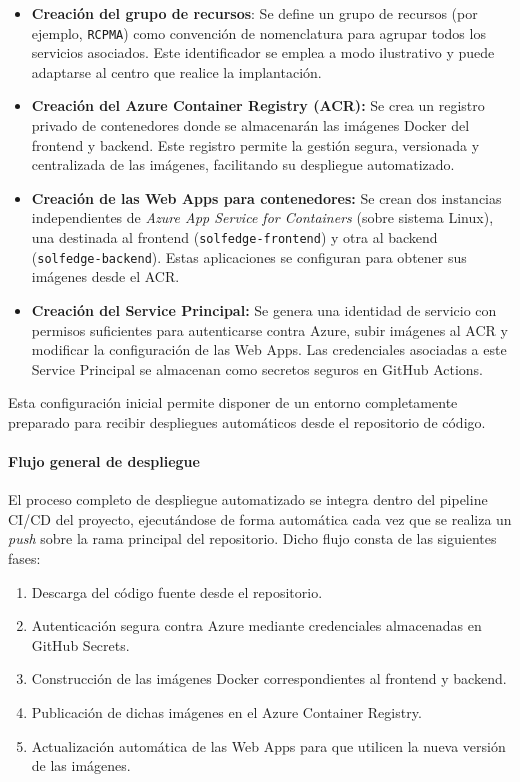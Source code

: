 \begin{itemize}
    \item \textbf{Creación del grupo de recursos}: Se define un grupo de recursos (por ejemplo, \texttt{RCPMA}) como convención de nomenclatura para agrupar todos los servicios asociados. Este identificador se emplea a modo ilustrativo y puede adaptarse al centro que realice la implantación.
    
    \item \textbf{Creación del Azure Container Registry (ACR):} Se crea un registro privado de contenedores donde se almacenarán las imágenes Docker del frontend y backend. Este registro permite la gestión segura, versionada y centralizada de las imágenes, facilitando su despliegue automatizado.
    
    \item \textbf{Creación de las Web Apps para contenedores:} Se crean dos instancias independientes de \textit{Azure App Service for Containers} (sobre sistema Linux), una destinada al frontend (\texttt{solfedge-frontend}) y otra al backend (\texttt{solfedge-backend}). Estas aplicaciones se configuran para obtener sus imágenes desde el ACR.
    
    \item \textbf{Creación del Service Principal:} Se genera una identidad de servicio con permisos suficientes para autenticarse contra Azure, subir imágenes al ACR y modificar la configuración de las Web Apps. Las credenciales asociadas a este Service Principal se almacenan como secretos seguros en GitHub Actions.
\end{itemize}

Esta configuración inicial permite disponer de un entorno completamente preparado para recibir despliegues automáticos desde el repositorio de código.

\paragraph{Flujo general de despliegue}

El proceso completo de despliegue automatizado se integra dentro del pipeline CI/CD del proyecto, ejecutándose de forma automática cada vez que se realiza un \textit{push} sobre la rama principal del repositorio. Dicho flujo consta de las siguientes fases:

\begin{enumerate}
    \item Descarga del código fuente desde el repositorio.
    \item Autenticación segura contra Azure mediante credenciales almacenadas en GitHub Secrets.
    \item Construcción de las imágenes Docker correspondientes al frontend y backend.
    \item Publicación de dichas imágenes en el Azure Container Registry.
    \item Actualización automática de las Web Apps para que utilicen la nueva versión de las imágenes.
\end{enumerate}

